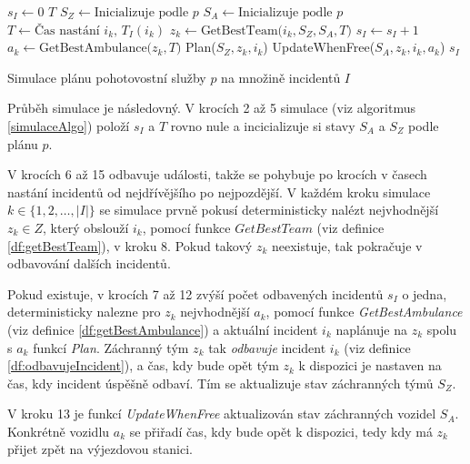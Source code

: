 \begin{algorithm}[H]
  \begin{algorithmic}[1]
    \State $s_I \gets 0$
    \State $T$ 
    \State $S_Z \gets \mbox{Inicializuje podle $p$}$
    \State $S_A \gets \mbox{Inicializuje podle $p$}$
      \State $T \gets \mbox{Čas nastání $i_k$, $T_I(i_k)$}$
      \State $z_k \gets \mbox{GetBestTeam($i_k, S_Z, S_A, T$)}$
        \State $s_I \gets s_I + 1$
        \State $a_k \gets \mbox{GetBestAmbulance($z_k, T$)}$
        \State Plan($S_Z, z_k, i_k$)
        \State UpdateWhenFree($S_A, z_k, i_k, a_k$)
      \EndIf
    \EndFor
    \State \Return $s_I$
  \EndFunction
  \end{algorithmic}
  \caption{Simulace plánu pohotovostní služby $p$ na množině incidentů $I$}
  \label{simulaceAlgo}
\end{algorithm}

\vspace*{10px}

Průběh simulace je následovný. 
V krocích 2 až 5 simulace (viz algoritmus \ref{simulaceAlgo}) položí $s_I$ a $T$ rovno nule
a incicializuje si stavy $S_A$ a $S_Z$ podle plánu $p$.

V krocích 6 až 15 odbavuje události, takže se pohybuje po krocích v časech nastání incidentů od nejdřívějšího po nejpozdější.
V každém kroku simulace $k \in \{ 1, 2, \dots , |I|\}$ se simulace prvně pokusí deterministicky nalézt nejvhodnější $z_k \in Z$, který obslouží $i_k$,
pomocí funkce $\textit{GetBestTeam}$ (viz definice \ref{df:getBestTeam}), v kroku 8.
Pokud takový $z_k$ neexistuje, tak pokračuje v odbavování dalších incidentů.

Pokud existuje, v krocích 7 až 12 zvýší počet odbavených incidentů $s_I$ o jedna,
deterministicky nalezne pro $z_k$ nejvhodnější $a_k$, pomocí funkce \textit{GetBestAmbulance} (viz definice \ref{df:getBestAmbulance}) a
aktuální incident $i_k$ naplánuje na $z_k$ spolu s $a_k$ funkcí \textit{Plan}.
Záchranný tým $z_k$ tak \textit{odbavuje} incident $i_k$ (viz definice \ref{df:odbavujeIncident}), a čas, kdy bude opět tým $z_k$ k dispozici je nastaven na čas, kdy incident úspěšně odbaví. 
Tím se aktualizuje stav záchranných týmů $S_Z$.

V kroku 13 je funkcí \textit{UpdateWhenFree} aktualizován stav záchranných vozidel $S_A$.
Konkrétně vozidlu $a_k$ se přiřadí čas, kdy bude opět k dispozici, tedy kdy má $z_k$ přijet zpět na výjezdovou stanici.


